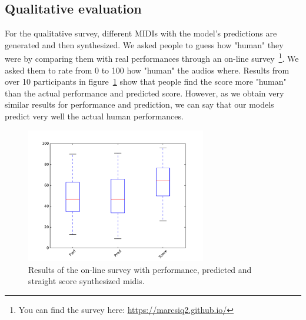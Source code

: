 



\subsection{Qualitative evaluation}

For the qualitative survey, different MIDIs with the model's predictions are generated and then synthesized. We asked people to guess how "human" they were by comparing them with real performances through an on-line survey~\footnote{You can find the survey here: \url{https://marcsiq2.github.io/}}. We asked them to rate from 0 to 100 how "human" the audios where. Results from over 10 participants in figure~\ref{fig:survey} show that people find the score more "human" than the actual performance and predicted score. However, as we obtain very similar results for performance and prediction, we can say that our models predict very well the actual human performances. 

\begin{figure}
\caption{Results of the on-line survey with performance, predicted and straight score synthesized midis.}
\label{fig:survey}
\centering
\includegraphics[width=0.7\textwidth]{Figures/survey.pdf}
\end{figure}


\cleardoublepage

